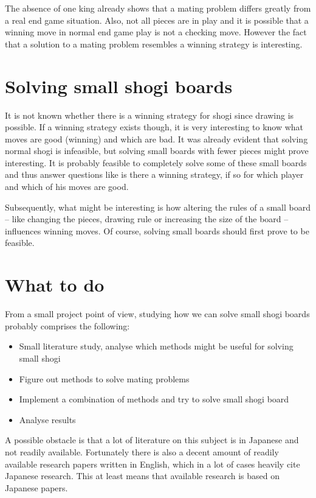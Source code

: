 \documentclass{paper}
\begin{document}
The absence of one king already shows that a mating problem differs greatly from a real end game situation. Also, not all pieces are in play and
it is possible that a winning move in normal end game play is not a checking move. However the fact that a solution to a mating problem resembles a winning
strategy is interesting.

\section{Solving small shogi boards}
It is not known whether there is a winning strategy for shogi since drawing is possible. If a winning strategy exists though,
it is very interesting to know what moves are good (winning) and which are bad. It was already evident that solving normal shogi
is infeasible, but solving small boards with fewer pieces might prove interesting. It is probably feasible to completely solve some of these
small boards and thus answer questions like is there a winning strategy, if so for which player and which of his moves are good.

Subsequently, what might be interesting is how altering the rules of a small board -- like changing the pieces, drawing rule or increasing the size of the board --
influences winning moves. Of course, solving small boards should first prove to be feasible.

\section{What to do}
From a small project point of view, studying how we can solve small shogi boards probably comprises the following:
\begin{itemize}
	\item Small literature study, analyse which methods might be useful for solving small shogi
	\item Figure out methods to solve mating problems
	\item Implement a combination of methods and try to solve small shogi board
	\item Analyse results
\end{itemize}
A possible obstacle is that a lot of literature on this subject is in Japanese and not readily available. Fortunately there is
also a decent amount of readily available research papers written in English, which in a lot of cases heavily cite Japanese research.
This at least means that available research is based on Japanese papers.
\end{document}

